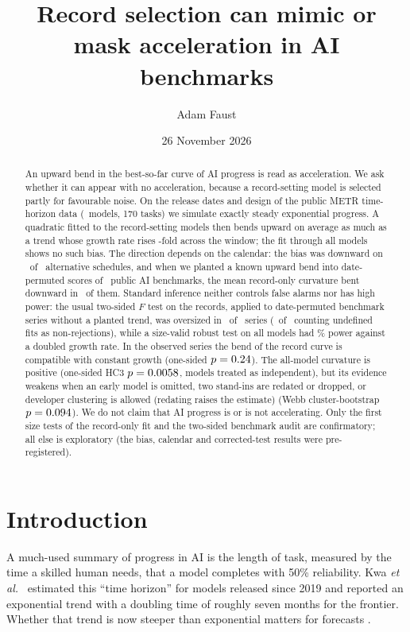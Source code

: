 \documentclass[aps,pre,twocolumn,superscriptaddress,nofootinbib,10pt]{revtex4-2}
\begin{document}
\title{Record selection can mimic or mask acceleration in AI benchmarks}

\author{Adam Faust}
\date{26 November 2026}

\begin{abstract}
An upward bend in the best-so-far curve of AI progress is read as acceleration. We ask whether it can appear with no acceleration, because a record-setting model is selected partly for favourable noise. On the release dates and design of the public METR time-horizon data (\nModels\ models, 170 tasks) we simulate exactly steady exponential progress. A quadratic fitted to the record-setting models then bends upward on average as much as a trend whose growth rate rises \biasRrSota-fold across the window; the fit through all models shows no such bias. The direction depends on the calendar: the bias was downward on \cfNeg\ of \cfOther\ alternative schedules, and when we planted a known upward bend into date-permuted scores of \mbN\ public AI benchmarks, the mean record-only curvature bent downward in \mbBiasNegSign\ of them. Standard inference neither controls false alarms nor has high power: the usual two-sided $F$ test on the records, applied to date-permuted benchmark series without a planted trend, was oversized in \mbBarOne\ of \mbN\ series (\mbIidTwoOverAtt\ of \mbN\ counting undefined fits as non-rejections), while a size-valid robust test on all models had \aTwoPowHcTwoRound\% power against a doubled growth rate. In the observed series the bend of the record curve is compatible with constant growth (one-sided $p=0.24$). The all-model curvature is positive (one-sided HC3 $p=0.0058$, models treated as independent), but its evidence weakens when an early model is omitted, two stand-ins are redated or dropped, or developer clustering is allowed (redating raises the estimate) (Webb cluster-bootstrap $p=0.094$). We do not claim that AI progress is or is not accelerating. Only the first size tests of the record-only fit and the two-sided benchmark audit are confirmatory; all else is exploratory (the bias, calendar and corrected-test results were pre-registered).
\end{abstract}

\maketitle

\section{Introduction}
A much-used summary of progress in AI is the length of task, measured by the time a skilled human needs, that a model completes with 50\% reliability. Kwa \emph{et al.}\ \cite{kwa2025} estimated this ``time horizon'' for models released since 2019 and reported an exponential trend with a doubling time of roughly seven months for the frontier. Whether that trend is now steeper than exponential matters for forecasts \cite{denain2026}.
\end{document}
